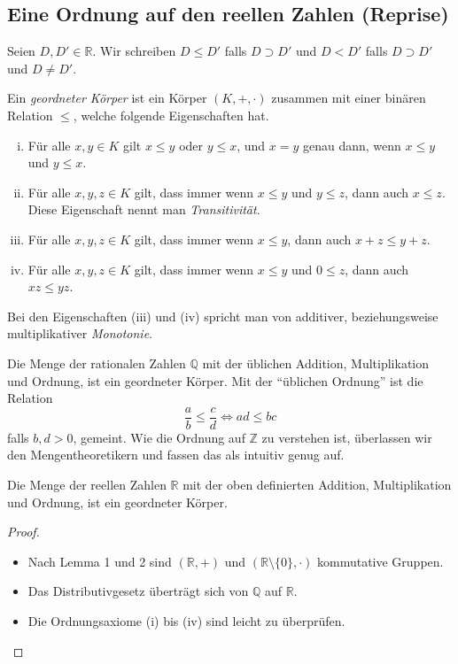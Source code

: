 \documentclass[../main.tex]{subfiles}
\begin{document}
\subsection*{Eine Ordnung auf den reellen Zahlen (Reprise)}
\begin{definition}
  Seien $D, D' \in \mathbb R$. Wir schreiben $D \leq D'$ falls
  $D \supset D'$ und $D < D'$ falls $D \supset D'$ und $D \neq D'$.
\end{definition}

\begin{definition}
  Ein \textit{geordneter Körper} ist ein Körper $(K, +, \cdot)$
  zusammen mit einer binären Relation $\leq$, welche folgende
  Eigenschaften hat.
  \begin{enumerate}[(i)]
    \item Für alle $x, y \in K$ gilt $x \leq y$ oder $y \leq x$,
      und $x = y$ genau dann, wenn $x \leq y$ und $y \leq x$.
    \item Für alle $x, y, z \in K$ gilt, dass immer wenn
      $x \leq y$ und $y \leq z$, dann auch $x \leq z$. Diese
      Eigenschaft nennt man \textit{Transitivität}.
    \item Für alle $x, y, z \in K$ gilt, dass immer wenn
      $x \leq y$, dann auch $x + z \leq y + z$.
    \item Für alle $x, y, z \in K$ gilt, dass immer wenn
      $x \leq y$ und $0 \leq z$, dann auch $xz \leq yz$.
  \end{enumerate}
  Bei den Eigenschaften (iii) und (iv) spricht man von additiver,
  beziehungsweise multiplikativer \textit{Monotonie}.
\end{definition}

\begin{example}
  Die Menge der rationalen Zahlen $\mathbb Q$ mit der üblichen
  Addition, Multiplikation und Ordnung, ist ein geordneter Körper.
  Mit der ``üblichen Ordnung'' ist die Relation
  \[ \frac{a}{b} \leq \frac{c}{d} \Leftrightarrow ad \leq bc\]
  falls $b, d > 0$, gemeint.
  Wie die Ordnung auf $\mathbb Z$ zu verstehen ist, überlassen
  wir den Mengentheoretikern und fassen das als intuitiv genug auf.
\end{example}

\begin{manualtheorem}{1}
  Die Menge der reellen Zahlen $\mathbb R$ mit der oben definierten
  Addition, Multiplikation und Ordnung, ist ein geordneter Körper.
\end{manualtheorem}

\begin{proof}
  \leavevmode
  \begin{itemize}
    \item Nach Lemma 1 und 2 sind $(\mathbb R, +)$ und
      $(\mathbb R \setminus \{0\}, \cdot)$ kommutative Gruppen.
    \item Das Distributivgesetz überträgt sich von $\mathbb Q$
      auf $\mathbb R$.
    \item Die Ordnungsaxiome (i) bis (iv) sind leicht zu überprüfen.
      \qedhere
  \end{itemize}
\end{proof}
\end{document}
